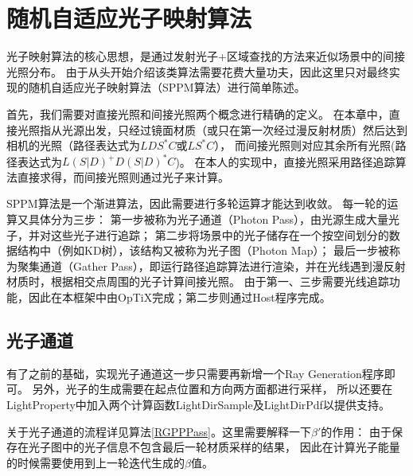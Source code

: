 \section{随机自适应光子映射算法}

光子映射算法的核心思想，是通过发射光子+区域查找的方法来近似场景中的间接光照分布。
由于从头开始介绍该类算法需要花费大量功夫，因此这里只对最终实现的随机自适应光子映射算法（SPPM算法）进行简单陈述。

首先，我们需要对直接光照和间接光照两个概念进行精确的定义。
在本章中，直接光照指从光源出发，只经过镜面材质（或只在第一次经过漫反射材质）然后达到相机的光照（路径表达式为$LDS^*C$或$LS^*C$），
而间接光照则对应其余所有光照(路径表达式为$L(S|D)^+D(S|D)^*C$)。
在本人的实现中，直接光照采用路径追踪算法直接求得，而间接光照则通过光子来计算。

SPPM算法是一个渐进算法，因此需要进行多轮运算才能达到收敛。
每一轮的运算又具体分为三步：
第一步被称为光子通道（Photon Pass），由光源生成大量光子，并对这些光子进行追踪；
第二步将场景中的光子储存在一个按空间划分的数据结构中（例如KD树），该结构又被称为光子图（Photon Map）；
最后一步被称为聚集通道（Gather Pass），即运行路径追踪算法进行渲染，并在光线遇到漫反射材质时，根据相交点周围的光子计算间接光照。
由于第一、三步需要光线追踪功能，因此在本框架中由OpTiX完成；第二步则通过Host程序完成。

\subsection{光子通道}

有了之前的基础，实现光子通道这一步只需要再新增一个Ray Generation程序即可。
另外，光子的生成需要在起点位置和方向两方面都进行采样，
所以还要在LightProperty中加入两个计算函数LightDirSample及LightDirPdf以提供支持。

关于光子通道的流程详见算法\ref{RGPPPass}。这里需要解释一下$\beta'$的作用：
由于保存在光子图中的光子信息不包含最后一轮材质采样的结果，
因此在计算光子能量的时候需要使用到上一轮迭代生成的$\beta$值。

